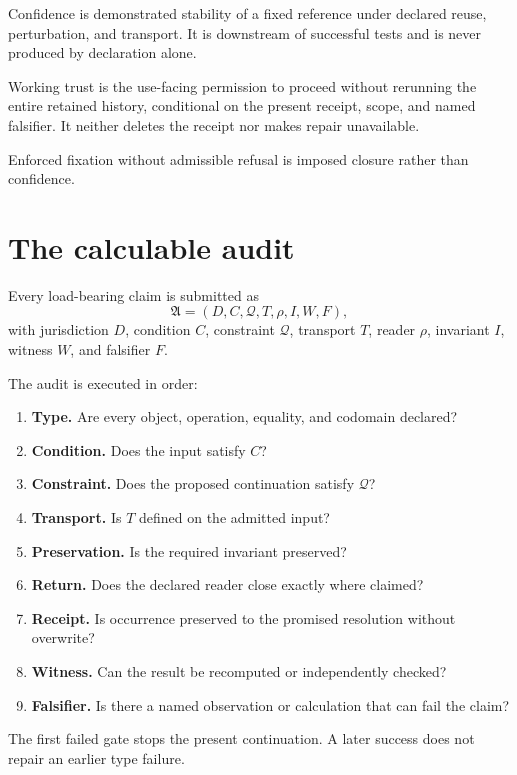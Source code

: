 \documentclass[11pt]{article}
\begin{document}
Confidence is demonstrated stability of a fixed reference under declared reuse, perturbation, and transport. It is downstream of successful tests and is never produced by declaration alone.

Working trust is the use-facing permission to proceed without rerunning the entire retained history, conditional on the present receipt, scope, and named falsifier. It neither deletes the receipt nor makes repair unavailable.

Enforced fixation without admissible refusal is imposed closure rather than confidence.

\section{The calculable audit}

Every load-bearing claim is submitted as
\[
\mathfrak A=(D,C,\mathcal Q,T,\rho,I,W,F),
\]
with jurisdiction $D$, condition $C$, constraint $\mathcal Q$, transport $T$, reader $\rho$, invariant $I$, witness $W$, and falsifier $F$.

The audit is executed in order:
\begin{enumerate}
\item \textbf{Type.} Are every object, operation, equality, and codomain declared?
\item \textbf{Condition.} Does the input satisfy $C$?
\item \textbf{Constraint.} Does the proposed continuation satisfy $\mathcal Q$?
\item \textbf{Transport.} Is $T$ defined on the admitted input?
\item \textbf{Preservation.} Is the required invariant preserved?
\item \textbf{Return.} Does the declared reader close exactly where claimed?
\item \textbf{Receipt.} Is occurrence preserved to the promised resolution without overwrite?
\item \textbf{Witness.} Can the result be recomputed or independently checked?
\item \textbf{Falsifier.} Is there a named observation or calculation that can fail the claim?
\end{enumerate}

The first failed gate stops the present continuation. A later success does not repair an earlier type failure.
\end{document}

